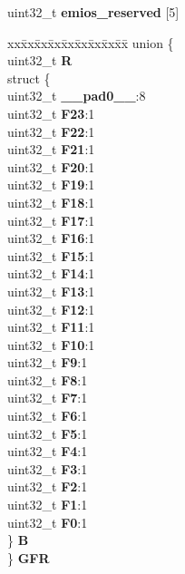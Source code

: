 \begin{DoxyCompactItemize}
\begin{tabbing}
\end{tabbing}\item 
\mbox{\label{structEMIOS__tag_a4bc6bcd2887c69ad092a3bbd17870054}} 
uint32\+\_\+t {\bfseries emios\+\_\+reserved} \mbox{[}5\mbox{]}
\item 
\mbox{\label{structEMIOS__tag_afd8deb2a2b61c9b3a0e6b167a99c3dc9}} 
\begin{tabbing}
xx\=xx\=xx\=xx\=xx\=xx\=xx\=xx\=xx\=\kill
union \{\\
\>uint32\_t {\bfseries R}\\
\>struct \{\\
\>\>uint32\_t {\bfseries \_\_pad0\_\_}:8\\
\>\>uint32\_t {\bfseries F23}:1\\
\>\>uint32\_t {\bfseries F22}:1\\
\>\>uint32\_t {\bfseries F21}:1\\
\>\>uint32\_t {\bfseries F20}:1\\
\>\>uint32\_t {\bfseries F19}:1\\
\>\>uint32\_t {\bfseries F18}:1\\
\>\>uint32\_t {\bfseries F17}:1\\
\>\>uint32\_t {\bfseries F16}:1\\
\>\>uint32\_t {\bfseries F15}:1\\
\>\>uint32\_t {\bfseries F14}:1\\
\>\>uint32\_t {\bfseries F13}:1\\
\>\>uint32\_t {\bfseries F12}:1\\
\>\>uint32\_t {\bfseries F11}:1\\
\>\>uint32\_t {\bfseries F10}:1\\
\>\>uint32\_t {\bfseries F9}:1\\
\>\>uint32\_t {\bfseries F8}:1\\
\>\>uint32\_t {\bfseries F7}:1\\
\>\>uint32\_t {\bfseries F6}:1\\
\>\>uint32\_t {\bfseries F5}:1\\
\>\>uint32\_t {\bfseries F4}:1\\
\>\>uint32\_t {\bfseries F3}:1\\
\>\>uint32\_t {\bfseries F2}:1\\
\>\>uint32\_t {\bfseries F1}:1\\
\>\>uint32\_t {\bfseries F0}:1\\
\>\} {\bfseries B}\\
\} {\bfseries GFR}\\


\end{tabbing}
\end{DoxyCompactItemize}
